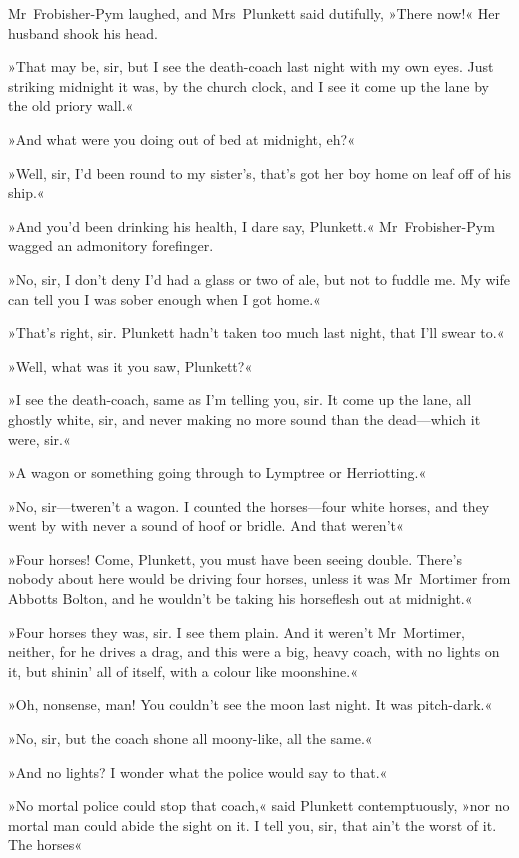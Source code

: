 Mr~Frobisher-Pym laughed, and Mrs~Plunkett said dutifully, »There now!« Her husband shook his head.

»That may be, sir, but I see the death-coach last night with my own eyes. Just striking midnight it was, by the church clock, and I see it come up the lane by the old priory wall.«

»And what were you doing out of bed at midnight, eh?«

»Well, sir, I'd been round to my sister's, that's got her boy home on leaf off of his ship.«

»And you'd been drinking his health, I dare say, Plunkett.« Mr~Frobisher-Pym wagged an admonitory forefinger.

»No, sir, I don't deny I'd had a glass or two of ale, but not to fuddle me. My wife can tell you I was sober enough when I got home.«

»That's right, sir. Plunkett hadn't taken too much last night, that I'll swear to.«

»Well, what was it you saw, Plunkett?«

»I see the death-coach, same as I'm telling you, sir. It come up the lane, all ghostly white, sir, and never making no more sound than the dead—which it were, sir.«

»A wagon or something going through to Lymptree or Herriotting.«

»No, sir—tweren't a wagon. I counted the horses—four white horses, and they went by with never a sound of hoof or bridle. And that weren't\longdash«

»Four horses! Come, Plunkett, you must have been seeing double. There's nobody about here would be driving four horses, unless it was Mr~Mortimer from Abbotts Bolton, and he wouldn't be taking his horseflesh out at midnight.«

»Four horses they was, sir. I see them plain. And it weren't Mr~Mortimer, neither, for he drives a drag, and this were a big, heavy coach, with no lights on it, but shinin' all of itself, with a colour like moonshine.«

»Oh, nonsense, man! You couldn't see the moon last night. It was pitch-dark.«

»No, sir, but the coach shone all moony-like, all the same.«

»And no lights? I wonder what the police would say to that.«

»No mortal police could stop that coach,« said Plunkett contemptuously, »nor no mortal man could abide the sight on it. I tell you, sir, that ain't the worst of it. The horses\longdash«

